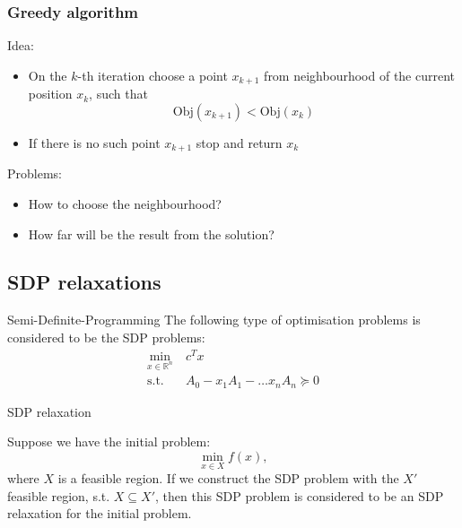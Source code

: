 \documentclass[10pt]{beamer}
\begin{document}
	\begin{frame}
		\frametitle{Greedy algorithm}
		
		{\Large Idea:}
		\begin{itemize}
			\item On the $k$-th iteration choose a point $x_{k+1}$ from neighbourhood 
			of the current position $x_k$, such that
			\[
				\text{Obj}(x_{k+1}) < \text{Obj}(x_k)
			\]
			\item If there is no such point $x_{k+1}$ stop and return $x_k$
		\end{itemize}
	
		\vspace{0.2in}
		{\Large Problems:}
		\begin{itemize}
			\item How to choose the neighbourhood?
			\item How far will be the result from the solution?
		\end{itemize}
	
	\end{frame}


    \subsection{SDP relaxations}

        \begin{frame}{Semi-Definite-Programming}
            The following type of optimisation problems is considered to be the SDP problems:
            \begin{align*}
                \min_{x \in \mathbb{R}^n} &~c^Tx\\
                \text{s.t.} &~A_0 - x_1A_1 - \dots x_nA_n \succeq 0
            \end{align*}
            
        \end{frame}
        
        \begin{frame}{SDP relaxation}
        
            Suppose we have the initial problem:
            \[
                \min_{x \in X} f(x),
            \]
            where $X$ is a feasible region. If we construct the SDP problem with the $X'$ feasible region, s.t. $X \subseteq X'$, then this SDP problem is considered to be an SDP relaxation for the initial problem.
            
            
        \end{frame}
        
\end{document}
